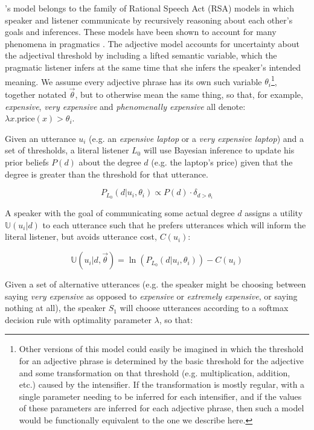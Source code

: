 \documentclass[10pt,letterpaper]{article}
\newcommand{\w}[1]{\emph{#1}}
\begin{document}
 's model belongs to the family of Rational Speech Act (RSA) models in which speaker and listener communicate by recursively reasoning about each other's goals and inferences. These models have been shown to account for many phenomena in pragmatics
\cite{frank, goodman}. The adjective model accounts for uncertainty about the adjectival threshold by including a lifted semantic variable, which the pragmatic listener infers at the same time that she infers the speaker's intended meaning. 
We assume every adjective phrase has its own such variable $\theta_i$\footnote{Other versions of this model could easily be imagined in which the threshold for an adjective phrase is determined by the basic threshold for the adjective and some transformation on that threshold (e.g. multiplication, addition, etc.) caused by the intensifier. If the transformation is mostly regular, with a single parameter needing to be inferred for each intensifier, and if the values of these parameters are inferred for each adjective phrase, then such a model would be functionally equivalent to the one we describe here.}, together notated $\vec{\theta}$, but to otherwise mean the same thing, so that, for example, \w{expensive}, \w{very expensive} and \w{phenomenally expensive} all denote: $\lambda x . \text{price}(x) > \theta_i$. %

Given an utterance $u_i$ (e.g. an \w{expensive laptop} or a \w{very expensive laptop}) and a set of thresholds, a literal listener $L_0$ will use Bayesian inference to update his prior beliefs $P(d)$ about the degree $d$ (e.g. the laptop's price) given that the degree is greater than the threshold for that utterance.

$$P_{L_0}(d|u_i, \theta_i) \propto P(d) \cdot \delta_{d > \theta_i}$$

A speaker with the goal of communicating some actual degree $d$ assigns a utility $\mathbb{U}(u_i|d)$ to each utterance such that he prefers utterances which will inform the literal listener, but avoids utterance cost, $C(u_i)$:

$$\mathbb{U}(u_i | d, \vec{\theta}) =  \ln\left(P_{L_0}(d | u_i, \theta_i) \right) - C(u_i) $$

Given a set of alternative utterances (e.g. the speaker might be choosing between saying \w{very expensive} as opposed to \w{expensive} or \w{extremely expensive}, or saying nothing at all), the speaker $S_1$ will choose utterances according to a softmax decision rule \cite{sutton} with optimality parameter $\lambda$, so that:
\end{document}
